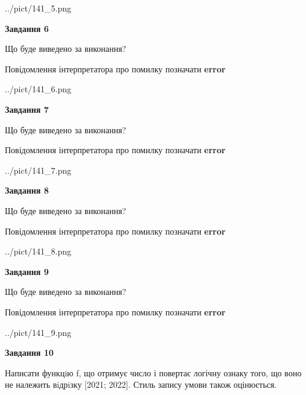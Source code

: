 \documentclass[12pt, ukrainian]{article}
\begin{document}
{\begin {large}
\begin{center}
	{../pict/141_5.png}
\end{center}
\newpage

{\begin {center}\textbf{Завдання 6}\end {center}}\par
Що буде виведено за виконання? \par
Повідомлення інтерпретатора про помилку позначати \textbf{error}

\begin{center}
	{../pict/141_6.png}
\end{center}
\newpage

{\begin {center}\textbf{Завдання 7}\end {center}}\par
Що буде виведено за виконання? \par
Повідомлення інтерпретатора про помилку позначати \textbf{error}

\begin{center}
	{../pict/141_7.png}
\end{center}
\newpage

{\begin {center}\textbf{Завдання 8}\end {center}}\par
Що буде виведено за виконання? \par
Повідомлення інтерпретатора про помилку позначати \textbf{error}

\begin{center}
	{../pict/141_8.png}
\end{center}
\newpage

{\begin {center}\textbf{Завдання 9}\end {center}}\par
Що буде виведено за виконання? \par
Повідомлення інтерпретатора про помилку позначати \textbf{error}

\begin{center}
	{../pict/141_9.png}
\end{center}
\newpage

{\begin {center}\textbf{Завдання 10}\end {center}}\par

Написати функцiю f, що отримує число і повертає логічну ознаку того, що воно не належить вiдрiзку [2021; 2022]. Стиль запису умови також оцінюється.\par
\newpage

\end {large}}
\end{document}
